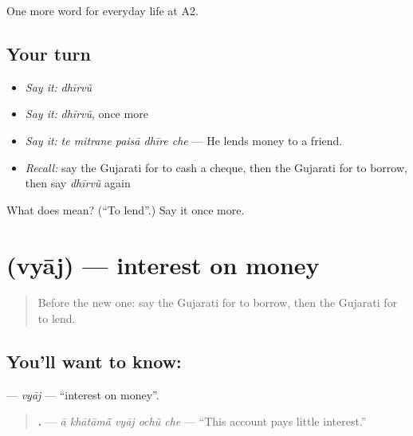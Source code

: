 \begin{grammarlens}[title={What you've built}]
One more word for everyday life at A2.
\end{grammarlens}

\subsection*{Your turn}
\begin{itemize}
\raggedright
  \item \emph{Say it:} \emph{dhīrvũ}
  \item \emph{Say it:} \emph{dhīrvũ}, once more
  \item \emph{Say it:} \emph{te mitrane paisā dhīre che} — He lends money to a friend.
  \item \emph{Recall:} say the Gujarati for to cash a cheque, then the Gujarati for to borrow, then say \emph{dhīrvũ} again
\end{itemize}

\begin{tcolorbox}[breakable,colback=teal!4,colframe=teal!35!black,title={Before you move on}]
What does  mean? (\textquotedblleft{}To lend\textquotedblright{}.) Say it once more.
\end{tcolorbox}
\section[\texorpdfstring{\gu{વ્યાજ} (vyāj)}{વ્યાજ (vyāj)}]{ (vyāj) — interest on money}

\label{lesson:GU-C191-vyaj}



\begin{quote}
Before the new one: say the Gujarati for to borrow, then the Gujarati for to lend.
\end{quote}

\subsection*{You'll want to know: }
\textbf{} — \emph{vyāj} — \textquotedblleft{}interest on money\textquotedblright{}.

\begin{quote}
\textbf{    .} — \emph{ā khātāmā̃ vyāj ochũ che} — \textquotedblleft{}This account pays little interest.\textquotedblright{}
\end{quote}

